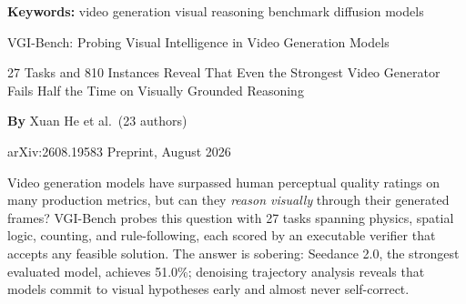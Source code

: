 \documentclass[10pt,twocolumn]{article}
\begin{document}
\setlength{\parindent}{0pt}
\setlength{\parskip}{4pt}

{\small\color{keywordgray}\textbf{Keywords:}
  video generation \textbullet{}
  visual reasoning \textbullet{}
  benchmark \textbullet{}
  diffusion models}\par\vspace{4pt}

{\LARGE\bfseries\raggedright
  VGI-Bench: Probing Visual Intelligence
  in Video Generation Models}\par\vspace{4pt}

{\large\itshape\raggedright
  27 Tasks and 810 Instances Reveal That Even the Strongest
  Video Generator Fails Half the Time on Visually Grounded Reasoning}\par\vspace{6pt}

{\small\textbf{By} Xuan He et al.\ (23 authors)}\par\vspace{2pt}

{\small\color{keywordgray}arXiv:2608.19583 \textbullet{} Preprint, August 2026}
\par\vspace{2pt}\noindent{\color{rulered}\rule{\columnwidth}{0.6pt}}\vspace{6pt}

Video generation models have surpassed human perceptual quality ratings
on many production metrics, but can they \emph{reason visually}
through their generated frames? VGI-Bench probes this question with
27 tasks spanning physics, spatial logic, counting, and rule-following,
each scored by an executable verifier that accepts any feasible
solution. The answer is sobering: Seedance 2.0, the strongest evaluated
model, achieves 51.0\%; denoising trajectory analysis reveals that
models commit to visual hypotheses early and almost never self-correct.
\end{document}
